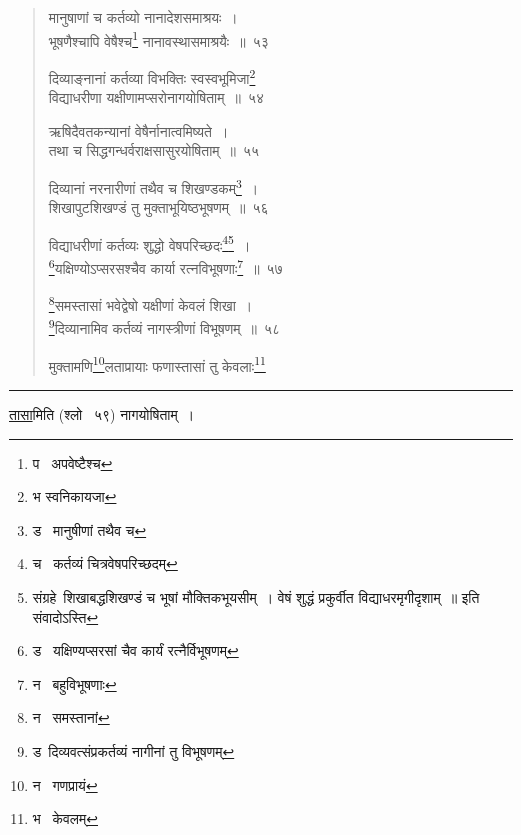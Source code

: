 \documentclass[11pt, openany]{book}
\begin{document}
\begin{quote}
{\na मानुषाणां च कर्तव्यो नानादेशसमाश्रयः~।\\
भूषणैश्चापि वेषैश्च\renewcommand{\thefootnote}{1}\footnote{प \textendash\ अपवेष्टैश्च} नानावस्थासमाश्रयैः~॥~५३

दिव्याङ्नानां कर्तव्या विभक्तिः स्वस्वभूमिजा\renewcommand{\thefootnote}{2}\footnote{भ स्वनिकायजा}\\
विद्याधरीणा यक्षीणामप्सरोनागयोषिताम्~॥~५४

ऋषिदैवतकन्यानां वेषैर्नानात्वमिष्यते~।\\
तथा च सिद्धगन्धर्वराक्षसासुरयोषिताम्~॥~५५

दिव्यानां नरनारीणां तथैव च शिखण्डकम्\renewcommand{\thefootnote}{3}\footnote{ड \textendash\ मानुषीणां तथैव च}~।\\
शिखापुटशिखण्डं तु मुक्ताभूयिष्ठभूषणम्~॥~५६

विद्याधरीणां कर्तव्यः शुद्धो वेषपरिच्छदः\renewcommand{\thefootnote}{4}\footnote{च \textendash\ कर्तव्यं चित्रवेषपरिच्छदम्}\renewcommand{\thefootnote}{*}\footnote{संग्रहे\textendash\ शिखाबद्धशिखण्डं च भूषां मौक्तिकभूयसीम्~। वेषं शुद्धं प्रकुर्वीत विद्याधरमृगीदृशाम्~॥ इति संवादोऽस्ति}~।\\
\renewcommand{\thefootnote}{5}\footnote{ड \textendash\ यक्षिण्यप्सरसां चैव कार्यं रत्नैर्विभूषणम्}यक्षिण्योऽप्सरसश्चैव कार्या रत्नविभूषणाः\renewcommand{\thefootnote}{6}\footnote{न \textendash\ बहुविभूषणाः}~॥~५७

\renewcommand{\thefootnote}{7}\footnote{न \textendash\ समस्तानां}समस्तासां भवेद्वेषो यक्षीणां केवलं शिखा~।\\
\renewcommand{\thefootnote}{8}\footnote{ड\textendash\ दिव्यवत्संप्रकर्तव्यं नागीनां तु विभूषणम्}दिव्यानामिव कर्तव्यं नागस्त्रीणां विभूषणम्~॥~५८

मुक्तामणि\renewcommand{\thefootnote}{9}\footnote{न \textendash\ गणप्रायं}लताप्रायाः फणास्तासां तु केवलाः\renewcommand{\thefootnote}{10}\footnote{भ \textendash\ केवलम्}}
\end{quote}

\hrule

\vspace{2mm}
\underline{तासा}मिति (श्लो \textendash\ ५९) नागयोषिताम्~। 

\newpage
\end{document}
